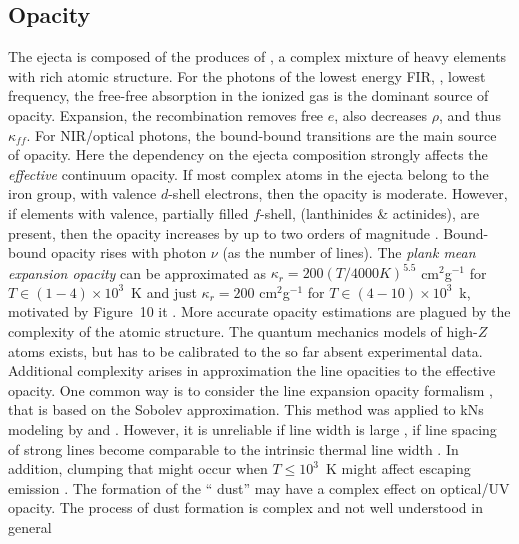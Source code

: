 \subsection{Opacity}

The ejecta is composed of the produces of \rproc{}, a complex mixture of heavy elements with 
rich atomic structure. 
For the photons of the lowest energy \ac{FIR}, \eg, lowest frequency, the free-free absorption 
in the ionized gas is the dominant source of opacity. Expansion, the recombination removes 
free $e$, also decreases $\rho$, and thus $\kappa_{ff}$.
For \ac{NIR}/optical photons, the bound-bound transitions are the main source of opacity. 
Here the dependency on the ejecta composition strongly affects the \textit{effective} continuum opacity. 
If most complex atoms in the ejecta belong to the iron group, with valence $d$-shell electrons, 
then the opacity is moderate. However, if elements with valence, partially filled $f$-shell, 
(lanthinides \& actinides), are present, then the opacity increases by up to two orders of magnitude
\citep{Kasen:2013xka,Tanaka:2013ana,Fontes:2015,Fontes:2017zfb}. 
Bound-bound opacity rises with photon $\nu$ (as the number of lines).
%
The \textit{plank mean expansion opacity} can be approximated as 
$\kappa_r = 200 (T/4000K)^{5.5}$ cm$^2$g$^{-1}$ for $T\in(1-4)\times10^3$~K and just 
$\kappa_r = 200$ cm$^2$g$^{-1}$ for $T\in(4-10)\times10^{3}$~k, motivated by 
Figure~10 it \citet{Kasen:2013xka}. More accurate opacity estimations are plagued by the 
complexity of the atomic structure. The quantum mechanics models of high-$Z$ atoms exists, 
but has to be calibrated to the so far absent experimental data.
%
Additional complexity arises in approximation the line opacities to the effective opacity.
One common way is to consider the line expansion opacity formalism \citep{Pinto:2000}, that is 
based on the Sobolev approximation. This method was applied to \acp{kN} modeling by 
\citet{Barnes:2013wka} and \citet{Tanaka:2013ana}. However, it is unreliable if line width is 
large \ie, if line spacing of strong lines become comparable to the intrinsic thermal line width 
\citep{Kasen:2013xka,Fontes:2015,Fontes:2017zfb}. 
%
In addition, clumping that might occur when $T\leq10^3$~K might affect escaping 
emission \citep{Takami:2014oqa}. The formation of the ``\rproc{} dust'' may have a complex 
effect on optical/UV opacity. The process of dust formation is complex and not 
well understood in general \citep{Cherchneff:2009sj,Lazzati:2016}
